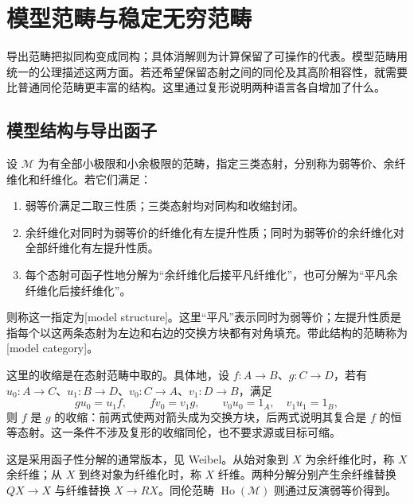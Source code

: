 
\section{模型范畴与稳定无穷范畴}
\label{b4:sec:B04}

导出范畴把拟同构变成同构；具体消解则为计算保留了可操作的代表。模型范畴用统一的公理描述这两方面。若还希望保留态射之间的同伦及其高阶相容性，就需要比普通同伦范畴更丰富的结构。这里通过复形说明两种语言各自增加了什么。

\subsection{模型结构与导出函子}
\label{b4:subsec:B04:01}

\begin{definition}\label{b4:def:B-model-category}
	设 \(\mathcal M\) 为有全部小极限和小余极限的范畴，指定三类态射，分别称为弱等价、余纤维化和纤维化。若它们满足：
	\begin{enumerate}
		\item 弱等价满足二取三性质；三类态射均对同构和收缩封闭。
		\item 余纤维化对同时为弱等价的纤维化有左提升性质；同时为弱等价的余纤维化对全部纤维化有左提升性质。
		\item 每个态射可函子性地分解为“余纤维化后接平凡纤维化”，也可分解为“平凡余纤维化后接纤维化”。
	\end{enumerate}
	则称这一指定为[model structure]。这里“平凡”表示同时为弱等价；左提升性质是指每个以这两条态射为左边和右边的交换方块都有对角填充。带此结构的范畴称为[model category]。
\end{definition}

这里的收缩是在态射范畴中取的。具体地，设 \(f:A\to B\)、\(g:C\to D\)，若有 \(u_0:A\to C\)、\(u_1:B\to D\)、\(v_0:C\to A\)、\(v_1:D\to B\)，满足
\[
	gu_0=u_1f,\qquad fv_0=v_1g,\qquad v_0u_0=1_A,\quad v_1u_1=1_B,
\]
则 \(f\) 是 \(g\) 的收缩：前两式使两对箭头成为交换方块，后两式说明其复合是 \(f\) 的恒等态射。这一条件不涉及复形的收缩同伦，也不要求源或目标可缩。

\ProseParagraphBreak
这是采用函子性分解的通常版本，见 Weibel\cite[Chapter V, Definition 10.4]{Weibel2013KBook}。从始对象到 \(X\) 为余纤维化时，称 \(X\) 余纤维；从 \(X\) 到终对象为纤维化时，称 \(X\) 纤维。两种分解分别产生余纤维替换 \(QX\rightarrow X\) 与纤维替换 \(X\rightarrow RX\)。同伦范畴 \(\operatorname{Ho}(\mathcal M)\) 则通过反演弱等价得到。

